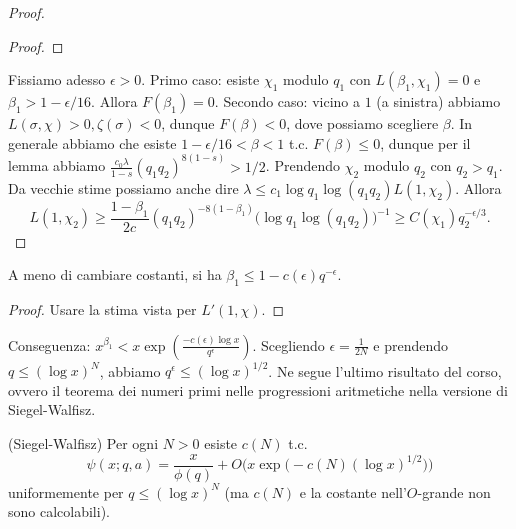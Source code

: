 \begin{proof}
\begin{proof}
  \end{proof}
  Fissiamo adesso $\epsilon>0$. Primo caso: esiste $\chi_1$ modulo $q_1$ con $L(\beta_1,\chi_1)=0$ e $\beta_1>1-\epsilon/16$. Allora $F(\beta_1)=0$. Secondo caso: vicino a $1$ (a sinistra) abbiamo $L(\sigma,\chi)>0,\zeta(\sigma)<0$, dunque $F(\beta)<0$, dove possiamo scegliere $\beta$.
  In generale abbiamo che esiste $1-\epsilon/16<\beta<1$ t.c. $F(\beta) \le 0$, dunque per il lemma abbiamo $\frac{c_0\lambda}{1-s}(q_1q_2)^{8(1-s)}>1/2$. Prendendo $\chi_2$ modulo $q_2$ con $q_2>q_1$. Da vecchie stime possiamo anche dire $\lambda \le c_1\log{q_1}\log(q_1q_2)L(1,\chi_2)$. Allora
  $$L(1,\chi_2) \ge \frac{1-\beta_1}{2c}(q_1q_2)^{-8(1-\beta_1)}\big(\log{q_1}\log(q_1q_2)\big)^{-1} \ge C(\chi_1)q_2^{-\epsilon/3}.$$
\end{proof}

\begin{cor}
  A meno di cambiare costanti, si ha $\beta_1 \le 1-c(\epsilon)q^{-\epsilon}$.
\end{cor}

\begin{proof}
  Usare la stima vista per $L'(1,\chi)$.
\end{proof}

Conseguenza: $x^{\beta_1}<x\exp\left(\frac{-c(\epsilon)\log{x}}{q^{\epsilon}}\right)$. Scegliendo $\epsilon=\frac{1}{2N}$ e prendendo $q \le (\log{x})^N$, abbiamo $q^{\epsilon} \le (\log{x})^{1/2}$. Ne segue l'ultimo risultato del corso, ovvero il teorema dei numeri primi nelle progressioni aritmetiche nella versione di Siegel-Walfisz.

\begin{prop}
  (Siegel-Walfisz) Per ogni $N>0$ esiste $c(N)$ t.c.
  $$\psi(x;q,a)=\frac{x}{\phi(q)}+O\Big(x\exp\big(-c(N)(\log{x})^{1/2}\big)\Big)$$
  uniformemente per $q \le (\log{x})^N$ (ma $c(N)$ e la costante nell'$O$-grande non sono calcolabili).
\end{prop}
